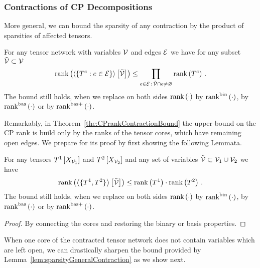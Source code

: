 \subsubsection{Contractions of CP Decompositions}

More general, we can bound the sparsity of any contraction by the product of sparsities of affected tensors.

\begin{theorem}\label{the:CPrankContractionBound}
	For any tensor network with variables $\mathcal{V}$ and edges $\mathcal{E}$ we have for any subset $\tilde{\mathcal{V}}\subset\mathcal{V}$
		\[ \mathrm{rank}\left(\left\langle \{T^{e} : e\in\mathcal{E} \}\right\rangle \left[ \tilde{\mathcal{V}} \right]\right) \leq 
		\prod_{e\in\mathcal{E} \, : \, \tilde{\mathcal{V}}\cap e \neq \varnothing} \mathrm{rank}\left(T^{e}\right) \, . \]
	The bound still holds, when we replace on both sides $\mathrm{rank}\left(\cdot\right)$ by $\mathrm{rank}^{\mathrm{bin}}\left(\cdot\right)$, by $\mathrm{rank}^{\mathrm{bas}}\left(\cdot\right)$ or by $\mathrm{rank}^{\mathrm{bas+}}\left(\cdot\right)$.
\end{theorem}


Remarkably, in Theorem~\ref{the:CPrankContractionBound} the upper bound on the CP rank is build only by the ranks of the tensor cores, which have remaining open edges.
We prepare for its proof by first showing the following Lemmata.

\begin{lemma}\label{lem:sparsityGeneralContraction}
	For any tensors $T^{1}\left[X_{\mathcal{V}_1}\right]$ and $T^{2}\left[X_{\mathcal{V}_2}\right]$ and any set of variables $\tilde{\mathcal{V}}\subset\mathcal{V}_1\cup\mathcal{V}_2$ we have
		\[ \mathrm{rank}\left(\left\langle \{T^{1},T^{2}\}\right\rangle \left[ \tilde{\mathcal{V}} \right]\right) \leq \mathrm{rank}\left(T^{1}\right) \cdot \mathrm{rank}\left(T^{2}\right) \, . \]
	The bound still holds, when we replace on both sides $\mathrm{rank}\left(\cdot\right)$ by $\mathrm{rank}^{\mathrm{bin}}\left(\cdot\right)$, by $\mathrm{rank}^{\mathrm{bas}}\left(\cdot\right)$ or by $\mathrm{rank}^{\mathrm{bas+}}\left(\cdot\right)$.
\end{lemma}
\begin{proof}
	By connecting the cores and restoring the binary or basis properties.
\end{proof}

When one core of the contracted tensor network does not contain variables which are left open, we can drastically sharpen the bound provided by Lemma~\ref{lem:sparsityGeneralContraction} as we show next.

